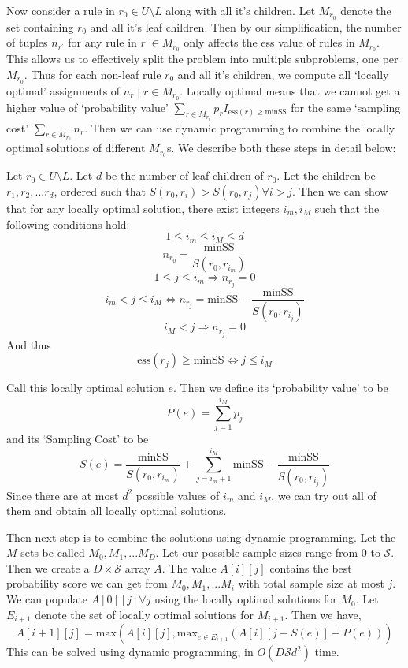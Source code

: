 Now consider a rule in $r_0 \in U \setminus L$ along with all it's children. Let $M_{r_0}$ denote the set containing $r_0$ and all it's leaf children. Then by our simplification, the number of tuples $n_{r^{\prime}}$ for any rule in $r^{\prime} \in M_{r_0}$ only affects the ess value of rules in $M_{r_0}$. This allows us to effectively split the problem into multiple subproblems, one per $M_{r_0}$. Thus for each non-leaf rule $r_0$ and all it's children, we compute all `locally optimal' assignments of $n_r \mid r \in M_{r_0}$. Locally optimal means that we cannot get a higher value of `probability value' $\sum_{r \in M_{r_0}} p_rI_{\text{ess}(r) \geq \text{minSS}}$ for the same `sampling cost' $\sum_{r\in M_{r_0}} n_r$. Then we can use dynamic programming to combine the locally optimal solutions of different $M_{r_0}$s. We describe both these steps in detail below:

Let $r_0 \in U \setminus L$. Let $d$ be the number of leaf children of $r_0$. Let the children be $r_1, r_2, ... r_d$, ordered such that $S(r_0, r_i) > S(r_0, r_j) \forall i > j$. Then we can show that for any locally optimal solution, there exist integers $i_m, i_M$ such that the following conditions hold:
$$1 \leq i_m \leq i_M \leq d$$
$$n_{r_0} = \frac{\text{minSS}}{S(r_0, r_{i_m})}$$
$$1 \leq j \leq i_m \Rightarrow n_{r_j} = 0$$
$$i_m < j \leq i_M \Leftrightarrow n_{r_j} = \text{minSS} - \frac{\text{minSS}}{S(r_0, r_{i_j})}$$
$$i_M < j \Rightarrow n_{r_j} = 0$$
And thus
$$\text{ess}(r_j) \geq \text{minSS} \Leftrightarrow j \leq i_M$$

Call this locally optimal solution $e$. Then we define its `probability value' to be
$$P(e) = \sum_{j = 1}^{i_M}p_{j}$$
and its `Sampling Cost' to be
$$S(e) = \frac{\text{minSS}}{S(r_0, r_{i_m})} + \sum_{j=i_m+1}^{i_M} \text{minSS} - \frac{\text{minSS}}{S(r_0, r_{i_j})}$$
Since there are at most $d^2$ possible values of $i_m$ and $i_M$, we can try out all of them and obtain all locally optimal solutions. 

Then next step is to combine the solutions using dynamic programming. Let the $M$ sets be called $M_0, M_1, ... M_D$. Let our possible sample sizes range from $0$ to $\mathcal{S}$. Then we create a $D \times \mathcal{S}$ array $A$. The value $A\left[i\right]\left[j\right]$ contains the best probability score we can get from $M_0, M_1, ... M_i$ with total sample size at most $j$. We can populate $A\left[0\right]\left[j\right] \forall j$ using the locally optimal solutions for $M_0$. Let $E_{i+1}$ denote the set of locally optimal solutions for $M_{i+1}$. Then we have,
$$A\left[i+1\right] \left[j \right] = \textrm{max} (A\left[i\right]\left[j\right], \textrm{max}_{e \in E_{i+1}}(A\left[i\right]\left[j-S(e)\right] + P(e)))$$
This can be solved using dynamic programming, in $O(D\mathcal{S}d^2)$ time. 


